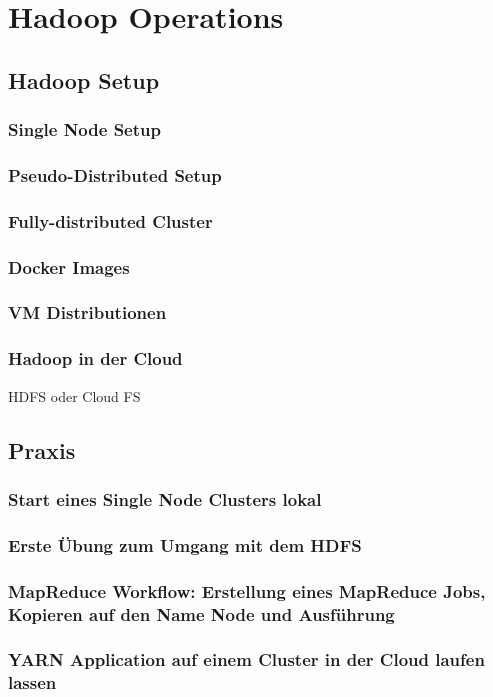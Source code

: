 \chapter{Hadoop Operations}
\section{Hadoop Setup} 
\subsection{Single Node Setup}
\subsection{Pseudo-Distributed Setup} 
\subsection{Fully-distributed Cluster}
\subsection{Docker Images}
\subsection{VM Distributionen}
\subsection{Hadoop in der Cloud}
HDFS oder Cloud FS 

\section{Praxis}
\subsection{Start eines Single Node Clusters lokal}
\subsection{Erste Übung zum Umgang mit dem HDFS}
\subsection{MapReduce Workflow: Erstellung eines MapReduce Jobs, Kopieren auf den Name Node und Ausführung}
\subsection{YARN Application auf einem Cluster in der Cloud laufen lassen}